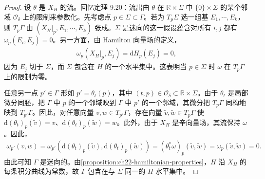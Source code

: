 \documentclass[../../main.tex]{subfiles}
\begin{document}
\begin{proof}
设 $\theta$ 是 $X_H$ 的流。回忆定理 9.20：流出由 $\theta$ 在 $\mathbb R\times\Sigma$ 中 $\{0\}\times\Sigma$ 的某个邻域 $\mathcal O_\delta$ 上的限制来参数化。先考虑点 $p\in\Sigma\subset\Gamma$。若为 $T_p\Sigma$ 选一组基 $E_1,\cdots ,E_k$，则 $T_p\Gamma$ 由 $(X_H|_p,E_1,\cdots ,E_k)$ 张成。$\Sigma$ 是迷向的这一假设蕴含对所有 $i,j$ 都有 $\omega_p(E_i,E_j)=0$。另一方面，由 Hamilton 向量场的定义，
\begin{align*}
\omega_p(X_H|_p,E_j)=\mathrm{d}H_p(E_j)=0,
\end{align*}
因为 $E_j$ 切于 $\Sigma$，而 $\Sigma$ 包含在 $H$ 的一个水平集中。这表明当 $p\in\Sigma$ 时 $\omega$ 在 $T_p\Gamma$ 上的限制为零。

任意另一点 $p'\in\Gamma$ 形如 $p'=\theta_t(p)$，其中 $(t,p)\in\mathcal O_\delta\subset\mathbb R\times\Sigma$。由于 $\theta_t$ 是局部微分同胚，把 $\Gamma$ 中 $p$ 的一个邻域映到 $\Gamma$ 中 $p'$ 的一个邻域，其微分把 $T_p\Gamma$ 同构地映到 $T_{p'}\Gamma$。因此，对任意向量 $v,w\in T_{p'}\Gamma$，存在向量 $\widetilde v,\widetilde w\in T_p\Gamma$ 使 $\mathrm{d}(\theta_t)_p(\widetilde v)=v$、$\mathrm{d}(\theta_t)_p(\widetilde w)=w$。此外，由于 $X_H$ 是辛向量场，其流保持 $\omega$。因此，
\begin{align*}
\omega_{p'}(v,w)=\omega_{p'}(\mathrm{d}(\theta_t)_p(\widetilde v),\mathrm{d}(\theta_t)_p(\widetilde w))
=(\theta_t^*\omega)_p(\widetilde v,\widetilde w)=\omega_p(\widetilde v,\widetilde w)=0.
\end{align*}
由此可知 $\Gamma$ 是迷向的。由\cref{proposition:ch22-hamiltonian-properties}，$H$ 沿 $X_H$ 的每条积分曲线为常数，故 $\Gamma$ 包含在与 $\Sigma$ 同一的 $H$ 水平集中。
\end{proof}
\end{document}
